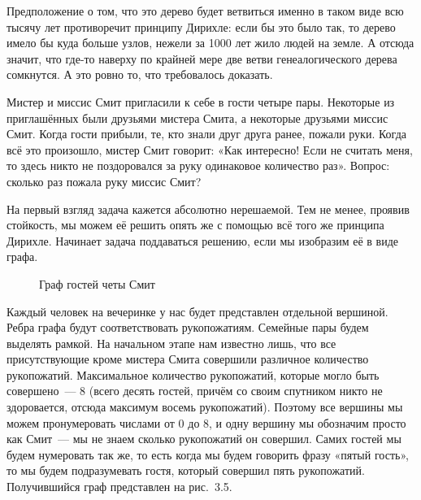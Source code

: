 \begin{example}
Предположение о том, что это дерево будет ветвиться именно в таком виде всю тысячу лет противоречит принципу Дирихле: если бы это было так, то дерево имело бы куда больше узлов, нежели за 1000 лет жило людей на земле. А отсюда значит, что где-то наверху по крайней мере две ветви генеалогического дерева сомкнутся. А это ровно то, что требовалось доказать.
\end{example}

\begin{example}
Мистер и миссис Смит пригласили к себе в гости четыре пары. Некоторые из приглашённых были друзьями мистера Смита, а некоторые друзьями миссис Смит. Когда гости прибыли, те, кто знали друг друга ранее, пожали руки. Когда всё это произошло, мистер Смит говорит: «Как интересно! Если не считать меня, то здесь никто не поздоровался за руку одинаковое количество раз». Вопрос: сколько раз пожала руку миссис Смит?

На первый взгляд задача кажется абсолютно нерешаемой. Тем не менее, проявив стойкость, мы можем её решить опять же с помощью всё того же принципа Дирихле. Начинает задача поддаваться решению, если мы изобразим её в виде графа.

\begin{figure}[h]
\centering
{}
\caption{Граф гостей четы Смит}
\end{figure}

Каждый человек на вечеринке у нас будет представлен отдельной вершиной. Ребра графа будут соответствовать рукопожатиям. Семейные пары будем выделять рамкой. На начальном этапе нам известно лишь, что все присутствующие кроме мистера Смита совершили различное количество рукопожатий. Максимальное количество рукопожатий, которые могло быть совершено~— 8 (всего десять гостей, причём со своим спутником никто не здоровается, отсюда максимум восемь рукопожатий). Поэтому все вершины мы можем пронумеровать числами от 0 до 8, и одну вершину мы обозначим просто как Смит~— мы не знаем сколько рукопожатий он совершил. Самих гостей мы будем нумеровать так же, то есть когда мы будем говорить фразу «пятый гость», то мы будем подразумевать гостя, который совершил пять рукопожатий. Получившийся граф представлен на рис.~3.5.


\end{example}
